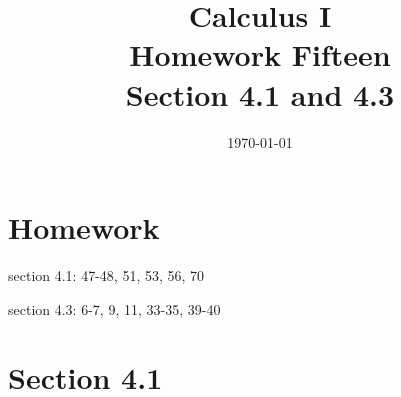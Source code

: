 \documentclass[letterpaper, landscape]{exam}
\title{Calculus I \\ Homework Fifteen \\ Section 4.1 and 4.3}
\author{}
\date{\today}
\begin{document}
  \maketitle

  \section{Homework}
    \begin{itemize*}
      \item section 4.1: 47-48, 51, 53, 56, 70
      \item section 4.3: 6-7, 9, 11, 33-35, 39-40
    \end{itemize*}

  \ifprintanswers

  \section{Section 4.1}
\end{document}
